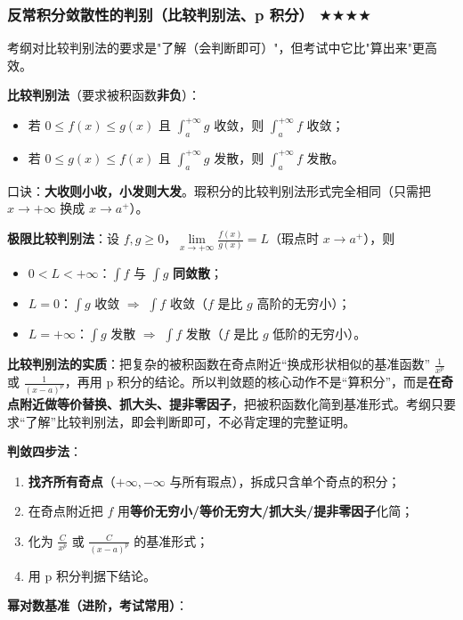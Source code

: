 \documentclass[11pt,openany,UTF8]{ctexbook}
\begin{document}
\subsubsection{反常积分敛散性的判别（比较判别法、p 积分） $\bigstar$$\bigstar$$\bigstar$$\bigstar$}

考纲对比较判别法的要求是"了解（会判断即可）"，但考试中它比"算出来"更高效。

\textbf{比较判别法}（要求被积函数\textbf{非负}）：

\begin{itemize}
\item 若 $0\leq f(x)\leq g(x)$ 且 $\int_a^{+\infty}g$ 收敛，则 $\int_a^{+\infty}f$ 收敛；
\item 若 $0\leq g(x)\leq f(x)$ 且 $\int_a^{+\infty}g$ 发散，则 $\int_a^{+\infty}f$ 发散。
\end{itemize}
口诀：\textbf{大收则小收，小发则大发}。瑕积分的比较判别法形式完全相同（只需把 $x\to+\infty$ 换成 $x\to a^+$）。

\textbf{极限比较判别法}：设 $f,g\geq0$，$\lim\limits_{x\to+\infty}\frac{f(x)}{g(x)}=L$（瑕点时 $x\to a^+$），则

\begin{itemize}
\item $0<L<+\infty$：$\int f$ 与 $\int g$ \textbf{同敛散}；
\item $L=0$：$\int g$ 收敛 $\Rightarrow$ $\int f$ 收敛（$f$ 是比 $g$ 高阶的无穷小）；
\item $L=+\infty$：$\int g$ 发散 $\Rightarrow$ $\int f$ 发散（$f$ 是比 $g$ 低阶的无穷小）。
\end{itemize}
\textbf{比较判别法的实质}：把复杂的被积函数在奇点附近“换成形状相似的基准函数” $\frac{1}{x^p}$ 或 $\frac{1}{(x-a)^p}$，再用 p 积分的结论。所以判敛题的核心动作不是“算积分”，而是\textbf{在奇点附近做等价替换、抓大头、提非零因子}，把被积函数化简到基准形式。考纲只要求“了解”比较判别法，即会判断即可，不必背定理的完整证明。

\textbf{判敛四步法}：

\begin{enumerate}
\item \textbf{找齐所有奇点}（$+\infty,-\infty$ 与所有瑕点），拆成只含单个奇点的积分；
\item 在奇点附近把 $f$ 用\textbf{等价无穷小/等价无穷大/抓大头/提非零因子}化简；
\item 化为 $\frac{C}{x^p}$ 或 $\frac{C}{(x-a)^p}$ 的基准形式；
\item 用 p 积分判据下结论。
\end{enumerate}
\textbf{幂对数基准（进阶，考试常用）}：
\end{document}
